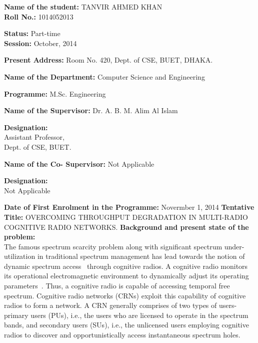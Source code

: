 \documentclass[12pt,addpoints,fleqn]{exam}
\begin{document}
\begin{questions}
{\bfseries \question}
\begin{minipage}[t]{0.7\textwidth}
\flushleft
\textbf{Name of the student:} TANVIR AHMED KHAN\\
\textbf{Roll No.:} 1014052013
\end{minipage}
\begin{minipage}[t]{0.3\textwidth}
\flushleft
\textbf{Status:} Part-time\\
\textbf{Session:} October, 2014
\end{minipage}
{\bfseries \question
\textbf{Present Address:}} Room No. 420, Dept. of CSE, BUET, DHAKA.
{\bfseries \question}
\begin{minipage}[t]{0.7\textwidth}
\flushleft
\textbf{Name of the Department:} Computer Science and Engineering
\end{minipage}
\begin{minipage}[t]{0.3\textwidth}
\flushleft
\textbf{Programme:} M.Sc. Engineering
\end{minipage}
{\bfseries \question}
\begin{minipage}[t]{0.7\textwidth}
\flushleft
\textbf{Name of the Supervisor:} Dr. A. B. M. Alim Al Islam
\end{minipage}
\begin{minipage}[t]{0.3\textwidth}
\flushleft
\textbf{Designation:}\\Assistant Professor, \\Dept. of CSE, BUET.
\end{minipage}
{\bfseries \question}
\begin{minipage}[t]{0.7\textwidth}
\flushleft
\textbf{Name of the Co- Supervisor:} Not Applicable
\end{minipage}
\begin{minipage}[t]{0.3\textwidth}
\flushleft
\textbf{Designation:}\\Not Applicable
\end{minipage}
{\bfseries \question
\textbf{Date of First Enrolment in the Programme:}} Novermber 1, 2014
{\bfseries \question
\textbf{Tentative Title:}} \MakeUppercase{Overcoming Throughput Degradation in Multi-Radio Cognitive Radio Networks.}
{\bfseries \question
\textbf{Background and present state of the problem:}}\\
The famous spectrum scarcity problem along with significant spectrum under-utilization in traditional spectrum management has lead towards the notion of dynamic spectrum access~\cite{akyildiz2006next} through cognitive radios. A cognitive radio monitors its operational electromagnetic environment to dynamically adjust its operating parameters~\cite{Mitola}. Thus, a cognitive radio is capable of accessing temporal free spectrum. Cognitive radio networks (CRNs) exploit this capability of cognitive radios to form a network. A CRN generally comprises of two types of users- primary users (PUs), i.e., the users who are licensed to operate in the spectrum bands, and secondary users (SUs), i.e., the unlicensed users employing cognitive radios to discover and opportunistically access instantaneous spectrum holes.


\end{questions}
\end{document}
